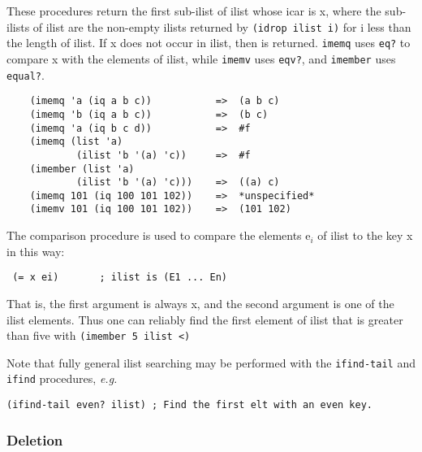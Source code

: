 \begin{entry}{%
  }

  These procedures
  return the first sub-ilist of ilist whose icar is x, where the
  sub-ilists of ilist are the non-empty ilists returned by
  \texttt{(idrop\ ilist\ i)} for i less than the length of ilist. If x
  does not occur in ilist, then \schfalse{} is
  returned. \texttt{imemq} uses \texttt{eq?} to compare x with the
  elements of ilist, while \texttt{imemv} uses \texttt{eqv?}, and
  \texttt{imember} uses \texttt{equal?}.

\begin{verbatim}
    (imemq 'a (iq a b c))           =>  (a b c)
    (imemq 'b (iq a b c))           =>  (b c)
    (imemq 'a (iq b c d))           =>  #f
    (imemq (list 'a)
            (ilist 'b '(a) 'c))     =>  #f
    (imember (list 'a)
            (ilist 'b '(a) 'c)))    =>  ((a) c)
    (imemq 101 (iq 100 101 102))    =>  *unspecified*
    (imemv 101 (iq 100 101 102))    =>  (101 102)
\end{verbatim}

  The comparison procedure is used to compare the elements e$_i$ of
  ilist to the key x in this way:

  \texttt{\ (=\ x\ ei)\ \ \ \ \ \ \ ;\ ilist\ is\ (E1\ ...\ En)}

  That is, the first argument is always x, and the second argument is
  one of the ilist elements. Thus one can reliably find the first
  element of ilist that is greater than five with \texttt{(imember\ 5\
    ilist\ \textless{})}

  Note that fully general ilist searching may be performed with the
  \texttt{ifind-tail} and \texttt{ifind} procedures, \emph{e.g.}

\begin{verbatim}
(ifind-tail even? ilist) ; Find the first elt with an even key.
\end{verbatim}
\end{entry}

\subsubsection{{Deletion}}

